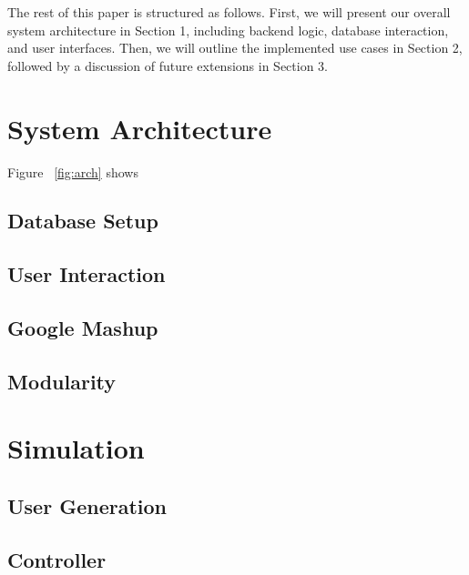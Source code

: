 \documentclass[11pt]{article}
\begin{document}
The rest of this paper is structured as follows. First, we will present our overall system architecture in Section 1, including backend logic, database interaction, and user interfaces. Then, we will outline the implemented use cases in Section 2, followed by a discussion of future extensions in Section 3.

\section{System Architecture}

Figure ~\ref{fig:arch} shows 


\subsection{Database Setup}


\subsection{User Interaction}


\subsection{Google Mashup}

\subsection{Modularity}





\section{Simulation}

\subsection{User Generation}

\subsection{Controller}

\end{document}
